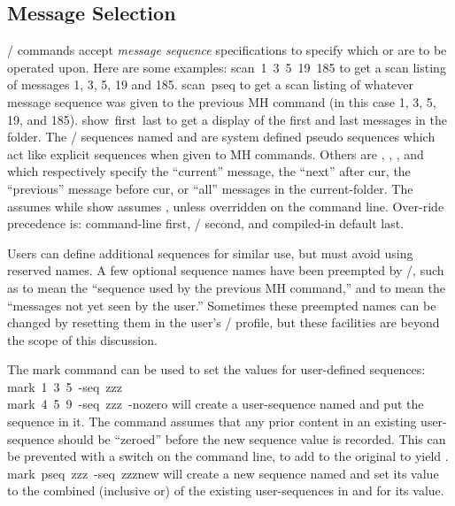 \subsection{Message Selection}			%
\MH/ commands accept {\it message sequence} specifications to specify which
 or  are to be operated upon.
Here are some examples:
\example scan\ 1\ 3\ 5\ 19\ 185\endexample
to get a scan listing of messages 1, 3, 5, 19 and 185.
\example scan\ pseq\endexample
to get a scan listing of whatever message sequence was given to the previous
MH command (in this case 1, 3, 5, 19, and 185).
\example show\ first\ last\endexample
to get a display of the first and last messages in the folder.
The \MH/ sequences named  and  are system defined pseudo
sequences which act like explicit sequences when given to MH commands.
Others are , , ,
and  which respectively specify the ``current'' message,
the ``next'' after cur,
the ``previous'' message before cur,
or ``all'' messages in the current-folder.
The  assumes  while show assumes ,
unless overridden on the command line.
Over-ride precedence is: command-line first,
\profile/ second,
and compiled-in default last.

Users can define additional sequences for similar use,
but must avoid using reserved names.
A few optional sequence names have been preempted by \MH/,
such as  to mean the
``sequence used by the previous MH command,''
and  to mean the ``messages not yet seen by the user.''
Sometimes these preempted names can be changed by resetting them in the
user's \MH/ profile,
but these facilities are beyond the scope of this discussion.

The mark command can be used to set the values for user-defined sequences:
\example mark\ 1\ 3\ 5\ -seq\ zzz\\
	 mark\ 4\ 5\ 9\ -seq\ zzz\ -nozero\endexample
will create a user-sequence named  and put the sequence 
in it.
The  command assumes that any prior content in an
existing user-sequence should be ``zeroed'' before the new sequence value is
recorded.
This can be prevented with a  switch on the command line,
to add  to the original  to yield .
\example mark\ pseq\ zzz\ -seq\ zzznew\endexample
will create a new sequence named  and set its value to the combined
(inclusive or) of the existing user-sequences in  and  for
its value.

